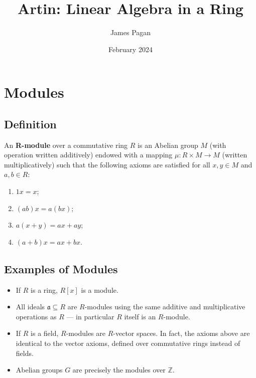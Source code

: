 \documentclass[11pt]{article}
\title{Artin: Linear Algebra in a Ring}
\author{James Pagan}
\date{February 2024}
\begin{document}
\maketitle
\tableofcontents
\newpage


\section{Modules}


\subsection{Definition}

An \textbf{R-module} over a commutative ring $R$ is an Abelian group $M$ (with operation written additively) endowed with a mapping $\mu : R \times M \to M$ (written multiplicatively) such that the following axioms are satisfied for all $x, y \in M$ and $a, b \in R$:
\begin{enumerate}
	\item $1x = x$;
	\item $(ab)x = a(bx)$;
	\item $a(x + y) = ax + ay$;
	\item $(a + b)x = ax + bx$.
\end{enumerate}


\subsection{Examples of Modules}

\begin{itemize}
	\item If $R$ is a ring, $R[x]$ is a module.
	\item All ideals $\mathfrak{a} \subseteq R$ are $R$-modules using the same additive and multiplicative operations as $R$ --- in particular $R$ itself is an $R$-module.
	\item If $R$ is a field, $R$-modules are $R$-vector spaces. In fact, the axioms above are identical to the vector axioms, defined over commutative rings instead of fields.
	\item Abelian groups $G$ are precisely the modules over $\mathbb{Z}$.
\end{itemize}
\end{document}
